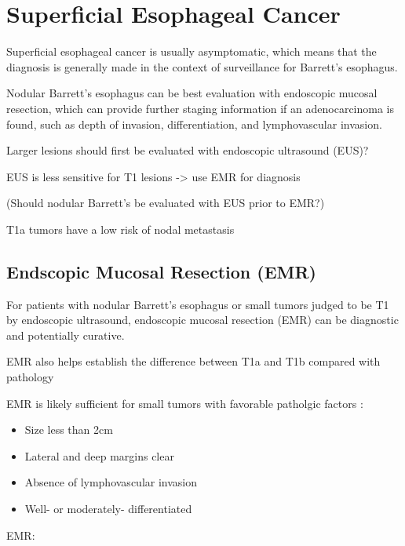 \documentclass[
]{book}
\providecommand{\tightlist}{%
  \setlength{\itemsep}{0pt}\setlength{\parskip}{0pt}}
\begin{document}
\hypertarget{superficial}{%
\chapter{Superficial Esophageal Cancer}\label{superficial}}

Superficial esophageal cancer is usually asymptomatic, which means that the diagnosis is generally made in the context of surveillance for Barrett's esophagus.

Nodular Barrett's esophagus can be best evaluation with endoscopic mucosal resection, which can provide further staging information if an adenocarcinoma is found, such as depth of invasion, differentiation, and lymphovascular invasion.

Larger lesions should first be evaluated with endoscopic ultrasound (EUS)?

EUS is less sensitive for T1 lesions \citep{bergeron765} -\textgreater{} use EMR for diagnosis \citep{maish1777}

(Should nodular Barrett's be evaluated with EUS prior to EMR?)

T1a tumors have a low risk of nodal metastasis \citep{dunbar850}

\hypertarget{emr}{%
\section{Endscopic Mucosal Resection (EMR)}\label{emr}}

For patients with nodular Barrett's esophagus or small tumors judged to be T1 by endoscopic ultrasound, endoscopic mucosal resection (EMR) can be diagnostic and potentially curative.\citep{thomas1609}

EMR also helps establish the difference between T1a and T1b compared with pathology \citep{worrell484}

EMR is likely sufficient for small tumors with favorable patholgic factors\citep{pech652} \citep{nurkin1090}:

\begin{itemize}
\tightlist
\item
  Size less than 2cm
\item
  Lateral and deep margins clear
\item
  Absence of lymphovascular invasion
\item
  Well- or moderately- differentiated
\end{itemize}

EMR: \citep{soetikno4490}
\end{document}
